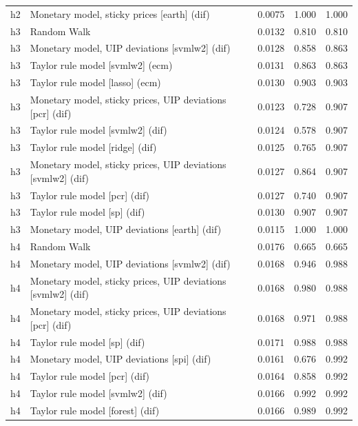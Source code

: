\begin{ThreePartTable}
\begin{longtable}[t]{cp{5.5cm}ccc}
h2 & \raggedright Monetary model, sticky prices [earth] (dif) & 0.0075 & 1.000 & 1.000\\
\addlinespace
h3 & \raggedright Random Walk & 0.0132 & 0.810 & 0.810\\
h3 & \raggedright Monetary model, UIP deviations [svmlw2] (dif) & 0.0128 & 0.858 & 0.863\\
h3 & \raggedright Taylor rule model [svmlw2] (ecm) & 0.0131 & 0.863 & 0.863\\
h3 & \raggedright Taylor rule model [lasso] (ecm) & 0.0130 & 0.903 & 0.903\\
h3 & \raggedright Monetary model, sticky prices, UIP deviations [pcr] (dif) & 0.0123 & 0.728 & 0.907\\
h3 & \raggedright Taylor rule model [svmlw2] (dif) & 0.0124 & 0.578 & 0.907\\
h3 & \raggedright Taylor rule model [ridge] (dif) & 0.0125 & 0.765 & 0.907\\
h3 & \raggedright Monetary model, sticky prices, UIP deviations [svmlw2] (dif) & 0.0127 & 0.864 & 0.907\\
h3 & \raggedright Taylor rule model [pcr] (dif) & 0.0127 & 0.740 & 0.907\\
h3 & \raggedright Taylor rule model [sp] (dif) & 0.0130 & 0.907 & 0.907\\
h3 & \raggedright Monetary model, UIP deviations [earth] (dif) & 0.0115 & 1.000 & 1.000\\
\addlinespace
h4 & \raggedright Random Walk & 0.0176 & 0.665 & 0.665\\
h4 & \raggedright Monetary model, UIP deviations [svmlw2] (dif) & 0.0168 & 0.946 & 0.988\\
h4 & \raggedright Monetary model, sticky prices, UIP deviations [svmlw2] (dif) & 0.0168 & 0.980 & 0.988\\
h4 & \raggedright Monetary model, sticky prices, UIP deviations [pcr] (dif) & 0.0168 & 0.971 & 0.988\\
h4 & \raggedright Taylor rule model [sp] (dif) & 0.0171 & 0.988 & 0.988\\
h4 & \raggedright Monetary model, UIP deviations [spi] (dif) & 0.0161 & 0.676 & 0.992\\
h4 & \raggedright Taylor rule model [pcr] (dif) & 0.0164 & 0.858 & 0.992\\
h4 & \raggedright Taylor rule model [svmlw2] (dif) & 0.0166 & 0.992 & 0.992\\
h4 & \raggedright Taylor rule model [forest] (dif) & 0.0166 & 0.989 & 0.992\\

\end{longtable}
\end{ThreePartTable}
